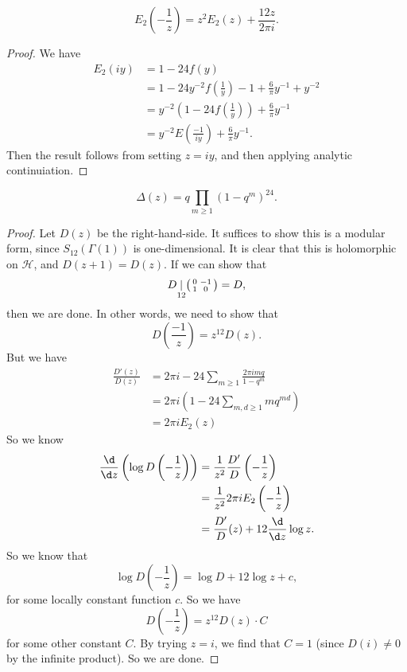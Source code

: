 \documentclass[a4paper]{article}
\renewcommand{\H}{\mathcal{H}}
\begin{document}
\begin{cor}
  \[
    E_2 \left(-\frac{1}{z}\right) = z^2 E_2(z) + \frac{12z}{2\pi i}.
  \]
\end{cor}

\begin{proof}
  We have
  \begin{align*}
    E_2(iy) &= 1 - 24 f(y)\\
    &= 1 - 24 y^{-2} f\left(\frac{1}{y}\right) - 1 + \frac{6}{\pi} y^{-1} + y^{-2}\\
    &= y^{-2}\left(1 - 24 f\left(\frac{1}{y}\right)\right) + \frac{6}{\pi} y^{-1}\\
    &= y^{-2}E\left(\frac{-1}{iy}\right) + \frac{6}{\pi} y^{-1}.
  \end{align*}
  Then the result follows from setting $z = iy$, and then applying analytic continuiation.
\end{proof}

\begin{cor}
  \[
    \Delta(z) = q \prod_{m \geq 1} (1 - q^m)^{24}.
  \]
\end{cor}

\begin{proof}
  Let $D(z)$ be the right-hand-side. It suffices to show this is a modular form, since $S_{12}(\Gamma(1))$ is one-dimensional. It is clear that this is holomorphic on $\H$, and $D(z + 1) = D(z)$. If we can show that
  \[
    D\underset{12}{|}
    \begin{psmallmatrix}
      0 & -1\\
      1 & 0
    \end{psmallmatrix} = D,
  \]
  then we are done. In other words, we need to show that
  \[
    D\left(\frac{-1}{z}\right) = z^{12}D(z).
  \]
  But we have
  \begin{align*}
    \frac{D'(z)}{D(z)} &= 2\pi i - 24 \sum_{m \geq 1} \frac{2\pi i m q}{1 - q^m} \\
    &= 2\pi i \left(1 - 24 \sum_{m, d\geq 1} m q^{md}\right)\\
    &= 2\pi i E_2(z)
  \end{align*}
  So we know
  \begin{align*}
    \frac{\d}{\d z}\left(\log D\left(-\frac{1}{z}\right)\right) &= \frac{1}{z^2} \frac{D'}{D}\left(-\frac{1}{z}\right) \\
    &= \frac{1}{z^2} 2\pi i E_2\left(-\frac{1}{z}\right)\\
    &= \frac{D'}{D}(z) + 12 \frac{\d}{\d z} \log z.
  \end{align*}
  So we know that
  \[
    \log D\left(-\frac{1}{z}\right) = \log D + 12 \log z + c,
  \]
  for some locally constant function $c$. So we have
  \[
    D\left(-\frac{1}{z}\right) = z^{12}D(z) \cdot C
  \]
  for some other constant $C$. By trying $z = i$, we find that $C = 1$ (since $D(i) \not= 0$ by the infinite product). So we are done.
\end{proof}
\end{document}
